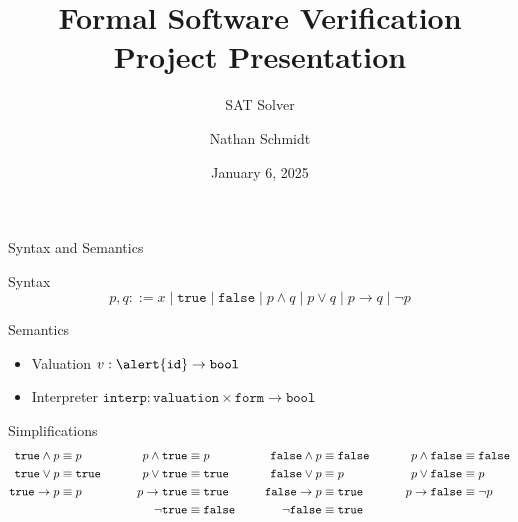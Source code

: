 \documentclass[aspectratio=169,xcolor=dvipsnames]{beamer}
\title{Formal Software Verification Project Presentation}
\subtitle{SAT Solver}
\date{January 6, 2025}
\author{Nathan Schmidt}
\institute{Aarhus University}
\begin{document}
    \maketitle

    \begin{frame}{Syntax and Semantics}
        \begin{block}{Syntax}
            $$p, q ::= x\;|\;\texttt{true}\;|\;\texttt{false}\;|\;p \land q\;|\;p \lor q\;|\;p \rightarrow q\;|\;\neg p$$
        \end{block}
        
        \begin{block}{Semantics}
            \begin{itemize}
                \item Valuation $v : \alert{\texttt{id}} \rightarrow \texttt{bool}$
                \item Interpreter $\texttt{interp} : \texttt{valuation} \times \texttt{form} \rightarrow \texttt{bool}$
            \end{itemize}
        \end{block}

    \end{frame}

    \begin{frame}{Simplifications}
        \small\begin{alignat*}{4}
            \texttt{true} \land p &\equiv p &p \land \texttt{true} &\equiv p &\texttt{false} \land p &\equiv \texttt{false}\hspace*{20pt}&p \land \texttt{false} &\equiv \texttt{false} \\
            \texttt{true} \lor p &\equiv \texttt{true}\hspace*{20pt}&p \lor \texttt{true} &\equiv \texttt{true}\hspace*{20pt}&\texttt{false} \lor p &\equiv p &p \lor \texttt{false} &\equiv p \\
            \texttt{true} \rightarrow p &\equiv p &p \rightarrow \texttt{true} &\equiv \texttt{true} &\texttt{false} \rightarrow p &\equiv \texttt{true} &p \rightarrow \texttt{false} &\equiv \neg p \\
            &&\neg \texttt{true} &\equiv \texttt{false} &\neg \texttt{false} &\equiv \texttt{true}
        \end{alignat*}

    \end{frame}
\end{document}
